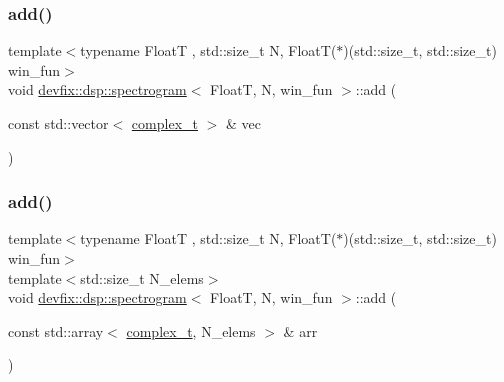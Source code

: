 \subsubsection{\texorpdfstring{add()}{add()}\hspace{0.1cm}{\footnotesize\ttfamily [2/3]}}
{\footnotesize\ttfamily template$<$typename FloatT , std\+::size\+\_\+t N, Float\+T($\ast$)(std\+::size\+\_\+t, std\+::size\+\_\+t) win\+\_\+fun$>$ \\
void \hyperlink{structdevfix_1_1dsp_1_1spectrogram}{devfix\+::dsp\+::spectrogram}$<$ FloatT, N, win\+\_\+fun $>$\+::add (\begin{DoxyParamCaption}\item[{const std\+::vector$<$ \hyperlink{structdevfix_1_1dsp_1_1spectrogram_a920fdda446509cfe81fa287773c709cb}{complex\+\_\+t} $>$ \&}]{vec }\end{DoxyParamCaption})\hspace{0.3cm}{\ttfamily [inline]}}

\mbox{\label{structdevfix_1_1dsp_1_1spectrogram_a030123c941c6acc6ea535514c2d138da}} 
\subsubsection{\texorpdfstring{add()}{add()}\hspace{0.1cm}{\footnotesize\ttfamily [3/3]}}
{\footnotesize\ttfamily template$<$typename FloatT , std\+::size\+\_\+t N, Float\+T($\ast$)(std\+::size\+\_\+t, std\+::size\+\_\+t) win\+\_\+fun$>$ \\
template$<$std\+::size\+\_\+t N\+\_\+elems$>$ \\
void \hyperlink{structdevfix_1_1dsp_1_1spectrogram}{devfix\+::dsp\+::spectrogram}$<$ FloatT, N, win\+\_\+fun $>$\+::add (\begin{DoxyParamCaption}\item[{const std\+::array$<$ \hyperlink{structdevfix_1_1dsp_1_1spectrogram_a920fdda446509cfe81fa287773c709cb}{complex\+\_\+t}, N\+\_\+elems $>$ \&}]{arr }\end{DoxyParamCaption})\hspace{0.3cm}{\ttfamily [inline]}}

\mbox{\label{structdevfix_1_1dsp_1_1spectrogram_acdc5a2253a62ae50ae24607cd4f3b555}} 
